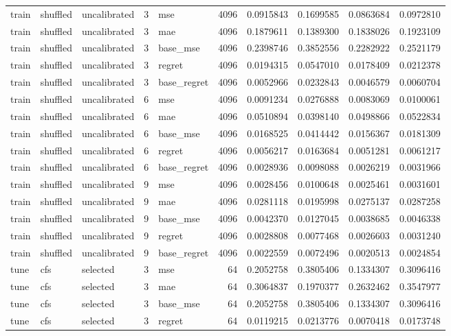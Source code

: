 \begin{tabular}{lllrlrrrrr}
train & shuffled & uncalibrated & 3 & mse & 4096 & 0.0915843 & 0.1699585 & 0.0863684 & 0.0972810 \\
train & shuffled & uncalibrated & 3 & mae & 4096 & 0.1879611 & 0.1389300 & 0.1838026 & 0.1923109 \\
train & shuffled & uncalibrated & 3 & base_mse & 4096 & 0.2398746 & 0.3852556 & 0.2282922 & 0.2521179 \\
train & shuffled & uncalibrated & 3 & regret & 4096 & 0.0194315 & 0.0547010 & 0.0178409 & 0.0212378 \\
train & shuffled & uncalibrated & 3 & base_regret & 4096 & 0.0052966 & 0.0232843 & 0.0046579 & 0.0060704 \\
train & shuffled & uncalibrated & 6 & mse & 4096 & 0.0091234 & 0.0276888 & 0.0083069 & 0.0100061 \\
train & shuffled & uncalibrated & 6 & mae & 4096 & 0.0510894 & 0.0398140 & 0.0498866 & 0.0522834 \\
train & shuffled & uncalibrated & 6 & base_mse & 4096 & 0.0168525 & 0.0414442 & 0.0156367 & 0.0181309 \\
train & shuffled & uncalibrated & 6 & regret & 4096 & 0.0056217 & 0.0163684 & 0.0051281 & 0.0061217 \\
train & shuffled & uncalibrated & 6 & base_regret & 4096 & 0.0028936 & 0.0098088 & 0.0026219 & 0.0031966 \\
train & shuffled & uncalibrated & 9 & mse & 4096 & 0.0028456 & 0.0100648 & 0.0025461 & 0.0031601 \\
train & shuffled & uncalibrated & 9 & mae & 4096 & 0.0281118 & 0.0195998 & 0.0275137 & 0.0287258 \\
train & shuffled & uncalibrated & 9 & base_mse & 4096 & 0.0042370 & 0.0127045 & 0.0038685 & 0.0046338 \\
train & shuffled & uncalibrated & 9 & regret & 4096 & 0.0028808 & 0.0077468 & 0.0026603 & 0.0031240 \\
train & shuffled & uncalibrated & 9 & base_regret & 4096 & 0.0022559 & 0.0072496 & 0.0020513 & 0.0024854 \\
tune & cfs & selected & 3 & mse & 64 & 0.2052758 & 0.3805406 & 0.1334307 & 0.3096416 \\
tune & cfs & selected & 3 & mae & 64 & 0.3064837 & 0.1970377 & 0.2632462 & 0.3547977 \\
tune & cfs & selected & 3 & base_mse & 64 & 0.2052758 & 0.3805406 & 0.1334307 & 0.3096416 \\
tune & cfs & selected & 3 & regret & 64 & 0.0119215 & 0.0213776 & 0.0070418 & 0.0173748 \\

\end{tabular}
